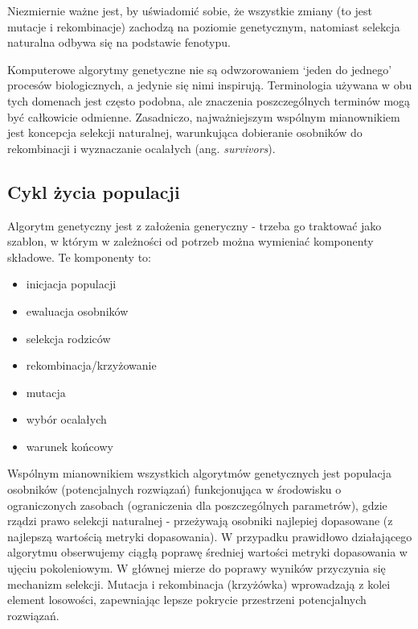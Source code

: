 \documentclass[a4paper,12pt]{article}
\numberwithin{figure}{section}
\begin{document}
    \bigskip

    Niezmiernie ważne jest, by uświadomić sobie, że wszystkie zmiany (to jest mutacje i rekombinacje) zachodzą na poziomie genetycznym, natomiast selekcja naturalna odbywa się na podstawie fenotypu\cite{IntroductionToEvolutionaryComputing2015}.

    \bigskip

    Komputerowe algorytmy genetyczne nie są odwzorowaniem `jeden do jednego' procesów biologicznych, a jedynie się nimi inspirują. Terminologia używana w obu tych domenach jest często podobna, ale znaczenia poszczególnych terminów mogą być całkowicie odmienne. Zasadniczo, najważniejszym wspólnym mianownikiem jest koncepcja selekcji naturalnej, warunkująca dobieranie osobników do rekombinacji i wyznaczanie ocalałych (ang. \textit{survivors}).

    \subsection{Cykl życia populacji}

    \noindent
    \begin{minipage}[H]{\textwidth}
        \setlength\parindent{17pt} Algorytm genetyczny jest z założenia generyczny - trzeba go traktować jako szablon, w którym w zależności od potrzeb można wymieniać komponenty składowe. Te komponenty to:
        \begin{itemize}
            \item inicjacja populacji
            \item ewaluacja osobników
            \item selekcja rodziców
            \item rekombinacja/krzyżowanie
            \item mutacja
            \item wybór ocalałych
            \item warunek końcowy
        \end{itemize}
    \end{minipage}

    \bigskip

    Wspólnym mianownikiem wszystkich algorytmów genetycznych jest populacja osobników (potencjalnych rozwiązań) funkcjonująca w środowisku o ograniczonych zasobach (ograniczenia dla poszczególnych parametrów), gdzie rządzi prawo selekcji naturalnej - przeżywają osobniki najlepiej dopasowane (z najlepszą wartością metryki dopasowania)\cite{IntroductionToEvolutionaryComputing2015}. W przypadku prawidłowo działającego algorytmu obserwujemy ciągłą poprawę średniej wartości metryki dopasowania w ujęciu pokoleniowym. W głównej mierze do poprawy wyników przyczynia się mechanizm selekcji. Mutacja i rekombinacja (krzyżówka) wprowadzają z kolei element losowości, zapewniając lepsze pokrycie przestrzeni potencjalnych rozwiązań.
\end{document}
